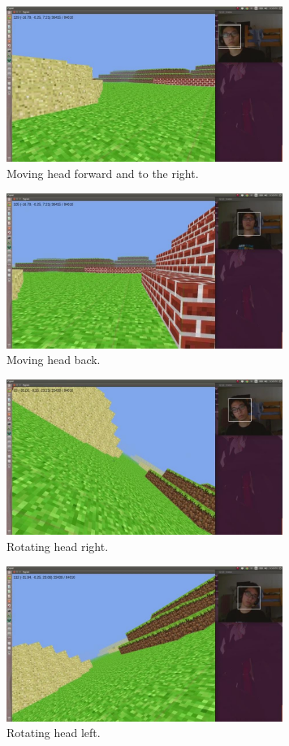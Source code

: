 \documentclass[10pt,twocolumn,letterpaper]{article}
\begin{document}
\begin{figure}[ht!]
\centering
\includegraphics[width=90mm]{forward.jpg}
\caption{Moving head forward and to the right.\label{overflow}}
\end{figure}

\begin{figure}[ht!]
\centering
\includegraphics[width=90mm]{back_away.jpg}
\caption{Moving head back.\label{overflow}}
\end{figure}

\begin{figure}[ht!]
\centering
\includegraphics[width=90mm]{rotation_left.jpg}
\caption{Rotating head right.\label{overflow}}
\end{figure}

\begin{figure}[ht!]
\centering
\includegraphics[width=90mm]{rotation_right.jpg}
\caption{Rotating head left.\label{overflow}}
\end{figure}
\end{document}
